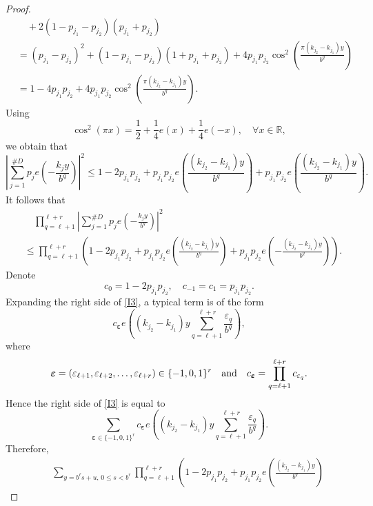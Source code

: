 \documentclass[amssymb,amsfonts,refcheck,12pt,verbatim,righttag]{amsart}
\numberwithin{equation}{section} %
\theoremstyle{plain}
\begin{document}
\begin{proof}
\begin{equation*}
\begin{aligned}
			&\quad +2(1-p_{j_{1}}-p_{j_{2}})(p_{j_{1}}+p_{j_{2}}) \\
			&=(p_{j_{1}}-p_{j_{2}})^{2}+(1-p_{j_{1}}-p_{j_{2}})(1+p_{j_{1}}+p_{j_{2}})+4p_{j_{1}}p_{j_{2}}\cos^{2}\left(\frac{\pi(k_{j_{2}}-k_{j_{1}})y}{b^{q}}\right)\\
        &=1-4p_{j_{1}}p_{j_{2}}+4p_{j_{1}}p_{j_{2}}\cos^{2}\left(\frac{\pi(k_{j_{2}}-k_{j_{1}})y}{b^{q}}\right).
		\end{aligned}
	\end{equation*}
Using
	$$\cos^{2}(\pi x)=\frac{1}{2}+\frac{1}{4}e(x)+\frac{1}{4}e(-x),\quad \forall x\in\mathbb{R},$$
	  we obtain that
\begin{equation*}%
		\left|\sum_{j=1}^{\#D}p_{j}e\left(-\frac{k_{j}y}{b^{q}}\right)\right|^{2}\leq1-2p_{j_{1}}p_{j_{2}}+p_{j_{1}}p_{j_{2}}e\left(\frac{(k_{j_{2}}-k_{j_{1}})y}{b^{q}}\right)
		+p_{j_{1}}p_{j_{2}}e\left(\frac{(k_{j_{2}}-k_{j_{1}})y}{b^{q}}\right).
	\end{equation*}
It follows that
\begin{equation}\label{I3}
		\begin{aligned}
			&\quad\prod_{q=\ell+1}^{\ell+r}\left|\sum_{j=1}^{\#D}p_{j}e\left(-\frac{k_{j}y}{b^{q}}\right)\right|^{2} \\
			&\leq\prod_{q=\ell+1}^{\ell+r}\left(1-2p_{j_{1}}p_{j_{2}}+p_{j_{1}}p_{j_{2}}e\left(\frac{(k_{j_{2}}-k_{j_{1}})y}{b^{q}}\right)
			+p_{j_{1}}p_{j_{2}}e\left(-\frac{(k_{j_{2}}-k_{j_{1}})y}{b^{q}}\right)\right).
		\end{aligned}
	\end{equation}
	Denote
	$$c_{0}=1-2p_{j_{1}}p_{j_{2}},\quad c_{-1}=c_{1}=p_{j_{1}}p_{j_{2}}.$$
Expanding the right side of \eqref{I3}, a typical term is of the form
$$c_{\boldsymbol{\varepsilon}}e\left((k_{j_{2}}-k_{j_{1}})y \sum_{q=\ell+1}^{\ell+r}\frac{\varepsilon_{q}}{b^{q}}\right),$$
	where
$$\boldsymbol{\varepsilon}=(\varepsilon_{\ell+1},\varepsilon_{\ell+2},\ldots,\varepsilon_{\ell+r})\in\{-1,0,1\}^{r}\quad {\rm and}\quad c_{\boldsymbol{\varepsilon}}=\prod_{q=\ell+1}^{\ell+r}c_{\varepsilon_{q}}.$$
Hence the right side of \eqref{I3} is equal to
\begin{equation*}
\sum_{\boldsymbol{\varepsilon}\in\{-1,0,1\}^{r}}c_{\boldsymbol{\varepsilon}}e\left( (k_{j_{2}}-k_{j_{1}})y \sum_{q=\ell+1}^{\ell+r}\frac{\varepsilon_{q}}{b^{q}}\right).
	\end{equation*}
	Therefore,
	\begin{equation*}
		\begin{aligned}
			&\quad\sum_{y=b^{\ell}s+u,\, 0\leq s< b^{r}}\prod_{q=\ell+1}^{\ell+r} \left(1-2p_{j_{1}}p_{j_{2}}+p_{j_{1}}p_{j_{2}}e\left(\frac{(k_{j_{2}}-k_{j_{1}})y}{b^{q}}\right)

\end{aligned}
\end{equation*}
\end{proof}
\end{document}
